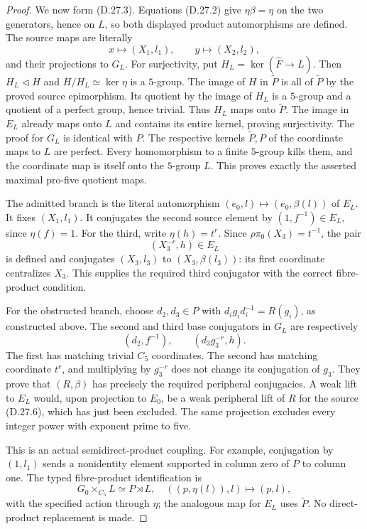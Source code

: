 \begin{proof}
We now form \textup{(D.27.3)}.  Equations
\textup{(D.27.2)} give $\eta\beta=\eta$ on the two
generators, hence on $L$, so both displayed product
automorphisms are defined.  The source maps are literally
\[
 x\longmapsto(X_1,l_1),\qquad
 y\longmapsto(X_2,l_2),
 \tag{D.27.11}
\]
and their projections to $G_L$.
For surjectivity, put $H_L=\ker(\widehat F\to L)$.
Then $H_L\triangleleft H$ and $H/H_L\simeq\ker\eta$
is a $5$-group.  The image of $H$ in $\widetilde P$ is
all of $\widetilde P$ by the proved source epimorphism.
Its quotient by the image of $H_L$ is a $5$-group and a
quotient of a perfect group, hence trivial.  Thus $H_L$
maps onto $\widetilde P$.  The image in $E_L$ already
maps onto $L$ and contains its entire kernel, proving
surjectivity.  The proof for $G_L$ is identical with $P$.
The respective kernels $\widetilde P,P$ of the coordinate
maps to $L$ are perfect.  Every homomorphism to a finite
$5$-group kills them, and the coordinate map is itself
onto the $5$-group $L$.  This proves exactly the asserted
maximal pro-five quotient maps.

The admitted branch is the literal automorphism
$(e_0,l)\mapsto(e_0,\beta(l))$ of $E_L$.
It fixes $(X_1,l_1)$.  It conjugates the second source
element by $(1,f^{-1})\in E_L$, since $\eta(f)=1$.
For the third, write $\eta(h)=t^r$.  Since
$\rho\pi_0(X_3)=t^{-1}$, the pair
\[
                  (X_3^{-r},h)\in E_L
 \tag{D.27.12}
\]
is defined and conjugates $(X_3,l_3)$ to
$(X_3,\beta(l_3))$: its first coordinate centralizes
$X_3$.  This supplies the required third conjugator with
the correct fibre-product condition.

For the obstructed branch, choose $d_2,d_3\in P$ with
$d_ig_id_i^{-1}=R(g_i)$, as constructed above.
The second and third base conjugators in $G_L$ are
respectively
\[
 (d_2,f^{-1}),\qquad (d_3g_3^{-r},h).
 \tag{D.27.13}
\]
The first has matching trivial $C_5$ coordinates.  The
second has matching coordinate $t^r$, and multiplying by
$g_3^{-r}$ does not change its conjugation of $g_3$.
They prove that $(R,\beta)$ has precisely the required
peripheral conjugacies.  A weak lift to $E_L$ would, upon
projection to $E_0$, be a weak peripheral lift of $R$ for
the source \textup{(D.27.6)}, which has just been excluded.
The same projection excludes every integer power with
exponent prime to five.

This is an actual semidirect-product coupling.  For example,
conjugation by $(1,l_1)$ sends a nonidentity element supported
in column zero of $P$ to column one.  The typed fibre-product
identification is
\[
 G_0\times_{C_5}L\simeq P\rtimes L,
 \quad ((p,\eta(l)),l)\longmapsto(p,l),
 \tag{D.27.14}
\]
with the specified action through $\eta$; the analogous
map for $E_L$ uses $\widetilde P$.  No direct-product
replacement is made.


\end{proof}
